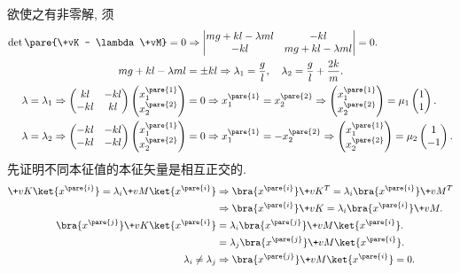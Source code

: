 \documentclass{ctexart}
\begin{document}
欲使之有非零解, 须
\begin{align*}
    \det \pare{\+vK - \lambda \+vM} = 0 &\Rightarrow \begin{vmatrix}
    mg + kl - \lambda ml & -kl \\
    -kl & mg + kl - \lambda ml
    \end{vmatrix} = 0. \\
    mg + kl - \lambda ml &= \pm kl \Rightarrow \lambda_1 = \frac{g}{l},\quad \lambda_2 = \frac{g}{l} + \frac{2k}{m}. \\
    \lambda = \lambda_1 \Rightarrow \begin{pmatrix}
        kl & -kl \\ -kl & kl
    \end{pmatrix} \begin{pmatrix}
        x_1^{\pare{1}} \\ x_2^{\pare{2}}
    \end{pmatrix} &= 0 \Rightarrow x_1^{\pare{1}} = x_2^{\pare{2}} \Rightarrow \begin{pmatrix}
        x_1^{\pare{1}} \\ x_2^{\pare{2}}
    \end{pmatrix} = \mu_1 \begin{pmatrix}
        1 \\ 1
    \end{pmatrix}. \\
    \lambda = \lambda_2 \Rightarrow \begin{pmatrix}
        -kl & -kl \\ -kl & -kl
    \end{pmatrix} \begin{pmatrix}
        x_1^{\pare{1}} \\ x_2^{\pare{2}}
    \end{pmatrix} &= 0 \Rightarrow x_1^{\pare{1}} = -x_2^{\pare{2}} \Rightarrow \begin{pmatrix}
        x_1^{\pare{1}} \\ x_2^{\pare{2}}
    \end{pmatrix} = \mu_2 \begin{pmatrix}
        1 \\ -1
    \end{pmatrix}.
\end{align*}
先证明不同本征值的本征矢量是相互正交的.
\begin{align*}
    \+vK \ket{x^{\pare{i}}} = \lambda_i \+vM \ket{x^{\pare{i}}} &\Rightarrow \bra{x^{\pare{i}}} \+vK^T = \lambda_i \bra{x^{\pare{i}}} \+vM^T\\ &\Rightarrow \bra{x^{\pare{i}}} \+vK = \lambda_i \bra{x^{\pare{i}}} \+vM. \\
    \bra{x^{\pare{j}}} \+vK \ket{x^{\pare{i}}} &= \lambda_i \bra{x^{\pare{j}}} \+vM \ket{x^{\pare{i}}}. \\
    &= \lambda_j \bra{x^{\pare{j}}} \+vM \ket{x^{\pare{i}}}. \\
    \lambda_i \neq \lambda_j &\Rightarrow \bra{x^{\pare{j}}} \+vM \ket{x^{\pare{i}}} = 0.
\end{align*}
\end{document}
